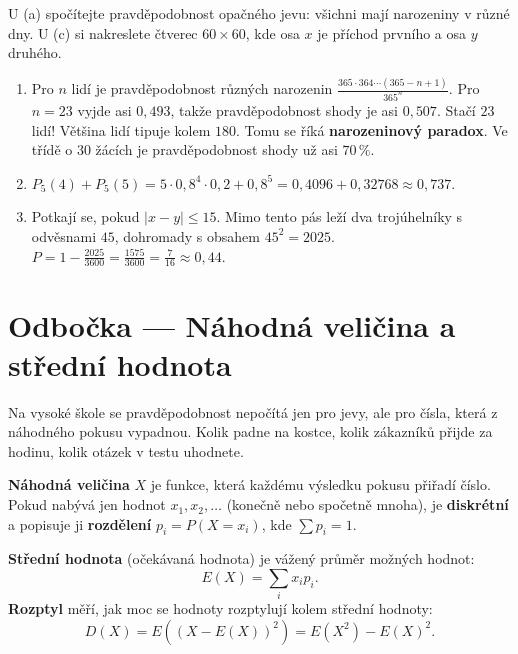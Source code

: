 \begin{hint}
  U (a) spočítejte pravděpodobnost opačného jevu: všichni mají narozeniny v různé dny. U (c) si nakreslete čtverec $60\times 60$, kde osa $x$ je příchod prvního a osa $y$ druhého.
\end{hint}

\begin{solution}
  \begin{enumerate}[label=(\alph*)]
    \item Pro $n$ lidí je pravděpodobnost různých narozenin $\frac{365\cdot 364\cdots(365 - n + 1)}{365^n}$. Pro $n = 23$ vyjde asi $0{,}493$, takže pravděpodobnost shody je asi $0{,}507$. Stačí $23$ lidí! Většina lidí tipuje kolem $180$. Tomu se říká \textbf{narozeninový paradox}. Ve třídě o $30$ žácích je pravděpodobnost shody už asi $70\,\%$.
    \item $P_5(4) + P_5(5) = 5\cdot 0{,}8^4\cdot 0{,}2 + 0{,}8^5 = 0{,}4096 + 0{,}32768\approx 0{,}737$.
    \item Potkají se, pokud $|x - y|\leq 15$. Mimo tento pás leží dva trojúhelníky s odvěsnami $45$, dohromady s obsahem $45^2 = 2025$. $P = 1 - \frac{2025}{3600} = \frac{1575}{3600} = \frac{7}{16}\approx 0{,}44$.
  \end{enumerate}
\end{solution}

\section{Odbočka --- Náhodná veličina a střední hodnota}

Na vysoké škole se pravděpodobnost nepočítá jen pro jevy, ale pro čísla, která z náhodného pokusu vypadnou. Kolik padne na kostce, kolik zákazníků přijde za hodinu, kolik otázek v testu uhodnete.

\begin{definitionbox}
  \textbf{Náhodná veličina} $X$ je funkce, která každému výsledku pokusu přiřadí číslo. Pokud nabývá jen hodnot $x_1, x_2, \ldots$ (konečně nebo spočetně mnoha), je \textbf{diskrétní} a popisuje ji \textbf{rozdělení} $p_i = P(X = x_i)$, kde $\sum p_i = 1$.

  \vspace{0.2cm}

  \textbf{Střední hodnota} (očekávaná hodnota) je vážený průměr možných hodnot:
  \begin{equation*}
    E(X) = \sum_i x_ip_i.
  \end{equation*}
  \textbf{Rozptyl} měří, jak moc se hodnoty rozptylují kolem střední hodnoty:
  \begin{equation*}
    D(X) = E\left({(X - E(X))}^2\right) = E(X^2) - {E(X)}^2.
  \end{equation*}
\end{definitionbox}

